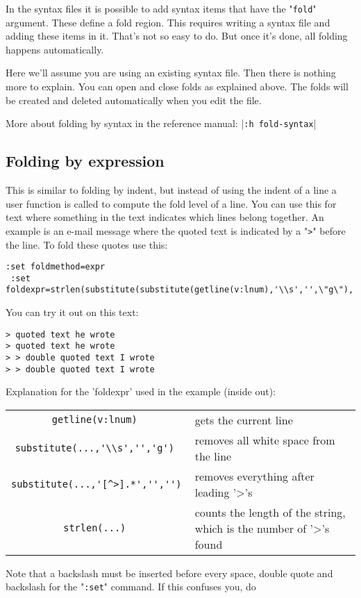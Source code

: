 In the syntax files it is possible to add syntax items that have the "\verb!fold!" argument.
These define a fold region.
This requires writing a syntax file and adding these items in it.
That's not so easy to do.
But once it's done, all folding happens automatically.

Here we'll assume you are using an existing syntax file.
Then there is nothing more to explain.
You can open and close folds as explained above.
The folds will be created and deleted automatically when you edit the file.

More about folding by syntax in the reference manual: |\verb!:h fold-syntax!|
\subsection{Folding by expression}
This is similar to folding by indent, but instead of using the indent of a line a user function is called to compute the fold level of a line.
You can use this for text where something in the text indicates which lines belong together.
An example is an e-mail message where the quoted text is indicated by a "\verb!>!" before the line.
To fold these quotes use this:

\begin{Verbatim}[samepage=true]
 :set foldmethod=expr
 :set foldexpr=strlen(substitute(substitute(getline(v:lnum),'\\s','',\"g\"),'[^>].*','',''))
\end{Verbatim}

You can try it out on this text:

\begin{Verbatim}[samepage=true]
> quoted text he wrote
> quoted text he wrote
> > double quoted text I wrote
> > double quoted text I wrote
\end{Verbatim}

Explanation for the 'foldexpr' used in the example (inside out):
\begin{center} \begin{tabular}{c l}
				\verb!getline(v:lnum) ! & gets the current line \\
				\verb!substitute(...,'\\s','','g') ! & removes all white space from the line \\
				\verb!substitute(...,'[^>].*','','') ! & removes everything after leading '>'s \\
				\verb!strlen(...) ! & counts the length of the string, which is the number of '>'s found \\
\end{tabular} \end{center}
Note that a backslash must be inserted before every space, double quote and backslash for the "\verb!:set!" command.
If this confuses you, do

